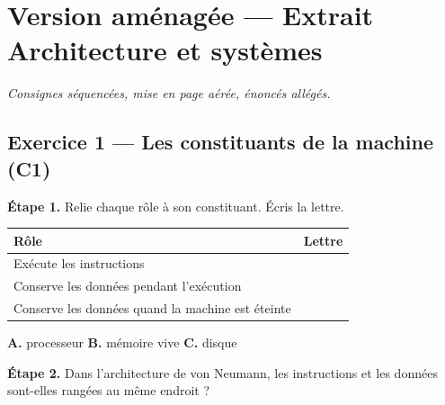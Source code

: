 \section*{Version aménagée --- Extrait Architecture et systèmes}
\textit{Consignes séquencées, mise en page aérée, énoncés allégés.}

\bigskip

\subsection*{Exercice 1 --- Les constituants de la machine (C1)}

\textbf{Étape 1.} Relie chaque rôle à son constituant. Écris la lettre.

\bigskip

\begin{center}
\begin{tabular}{|l|c|}
\hline
\textbf{Rôle} & \textbf{Lettre} \\
\hline
Exécute les instructions & \dotfill \\
\hline
Conserve les données pendant l'exécution & \dotfill \\
\hline
Conserve les données quand la machine est éteinte & \dotfill \\
\hline
\end{tabular}
\end{center}

\medskip
\textbf{A.} processeur \qquad \textbf{B.} mémoire vive \qquad \textbf{C.} disque

\bigskip

\textbf{Étape 2.} Dans l'architecture de von Neumann, les instructions et les
données sont-elles rangées au même endroit ?

\medskip
\begin{center}
 \qquad {}
\end{center}

\bigskip
\bigskip

